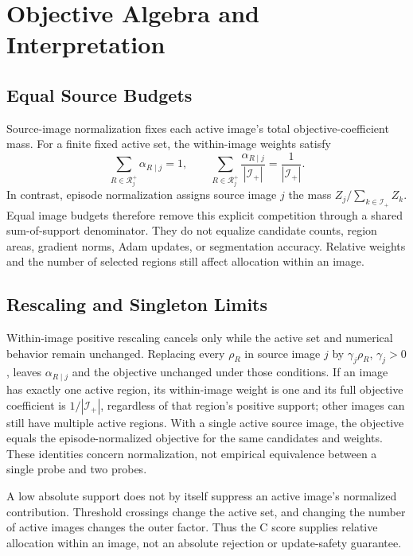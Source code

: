 \section{Objective Algebra and Interpretation}
\label{app:theory}
\subsection{Equal Source Budgets}
Source-image normalization fixes each active image's total objective-coefficient mass. For a finite fixed active set, the within-image weights satisfy
\begin{equation}
\sum_{R\in\mathcal R_j^+}\alpha_{R\mid j}=1,\qquad
\sum_{R\in\mathcal R_j^+}\frac{\alpha_{R\mid j}}{|\mathcal I_+|}
=\frac1{|\mathcal I_+|}.
\end{equation}
In contrast, episode normalization assigns source image $j$ the mass $Z_j/\sum_{k\in\mathcal I_+}Z_k$. Equal image budgets therefore remove this explicit competition through a shared sum-of-support denominator. They do not equalize candidate counts, region areas, gradient norms, Adam updates, or segmentation accuracy. Relative weights and the number of selected regions still affect allocation within an image.

\subsection{Rescaling and Singleton Limits}
Within-image positive rescaling cancels only while the active set and numerical behavior remain unchanged. Replacing every $\rho_R$ in source image $j$ by $\gamma_j\rho_R$, $\gamma_j>0$, leaves $\alpha_{R\mid j}$ and the objective unchanged under those conditions. If an image has exactly one active region, its within-image weight is one and its full objective coefficient is $1/|\mathcal I_+|$, regardless of that region's positive support; other images can still have multiple active regions. With a single active source image, the objective equals the episode-normalized objective for the same candidates and weights. These identities concern normalization, not empirical equivalence between a single probe and two probes.

A low absolute support does not by itself suppress an active image's normalized contribution. Threshold crossings change the active set, and changing the number of active images changes the outer factor. Thus the C score supplies relative allocation within an image, not an absolute rejection or update-safety guarantee.

